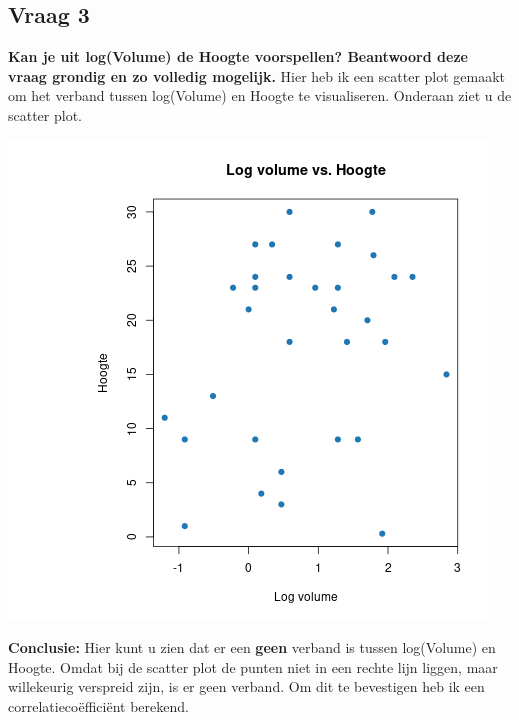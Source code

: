 \documentclass[12pt]{article}
\begin{document}
\subsection{Vraag 3}
\textbf{Kan je uit log(Volume) de Hoogte voorspellen? Beantwoord deze vraag grondig en zo volledig mogelijk.}
\newline\newline
Hier heb ik een scatter plot gemaakt om het verband tussen log(Volume) en Hoogte te visualiseren.
Onderaan ziet u de scatter plot.
\newline\newline
\noindent\begin{minipage}{.7\linewidth}
    \centering
    \includegraphics[width=\linewidth]{vragen/vraag3/images/scatter_plot.png}
    \label{fig:scatter_plot}
\end{minipage}
\newline\newline\newline
\textbf{Conclusie:} Hier kunt u zien dat er een \textbf{geen} verband is tussen log(Volume) en Hoogte.
Omdat bij de scatter plot de punten niet in een rechte lijn liggen, maar willekeurig verspreid zijn, is er geen verband.
Om dit te bevestigen heb ik een correlatiecoëfficiënt berekend.
\end{document}
